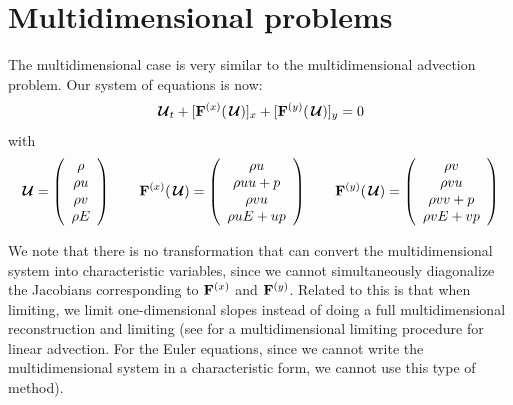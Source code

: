 \section{Multidimensional problems}

The multidimensional case is very similar to the multidimensional
advection problem.  Our system of equations is now:
\begin{equation}
{\,\boldsymbol{\mathcal{U}}}_t + [{\bf F}^{(x)}({\,\boldsymbol{\mathcal{U}}})]_x + [{\bf F}^{(y)}({\,\boldsymbol{\mathcal{U}}})]_y = 0
\end{equation}
with
\begin{equation}
\Uc = \left ( \begin{array}{c} \rho \\ \rho u \\ \rho v \\ \rho E \end{array} \right )
%
\qquad
%
\Fb^{(x)}(\Uc) = \left ( \begin{array}{c} \rho u \\ \rho uu + p \\ \rho v u \\ \rho u E + up \end{array} \right )
%
\qquad
\Fb^{(y)}(\Uc) = \left ( \begin{array}{c} \rho v \\ \rho vu     \\ \rho v v + p \\ \rho v E + vp \end{array} \right )
\end{equation}

We note that there is no transformation that can convert the multidimensional
system into characteristic variables, since we cannot simultaneously
diagonalize the Jacobians corresponding to ${\bf F}^{(x)}$ and ${\bf F}^{(y)}$.  Related
to this is that when limiting, we limit one-dimensional slopes instead of
doing a full multidimensional reconstruction and limiting (see \cite{BDS}
for a multidimensional limiting procedure for linear advection.  For
the Euler equations, since we cannot write the multidimensional system
in a characteristic form, we cannot use this type of method).

